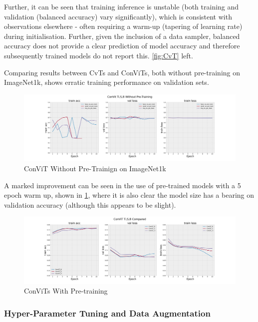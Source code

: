 Further, it can be seen that training inference is unstable (both training and validation (balanced accuracy) vary significantly), which is consistent with observations elsewhere - often requiring a warm-up (tapering of learning rate) during initialisation. Further, given the inclusion of a data sampler, balanced accuracy does not provide a clear prediction of model accuracy and therefore subsequently trained models do not report this. \ref{fig:CvT} left.

Comparing results between CvTs and ConViTs, both without pre-training on ImageNet1k, shows erratic training performance on validation sets. 

\begin{figure}[htp!]
    \centering
    \includegraphics[width=\textwidth]{figures/results_and_discussion/ConViT Ti,S,B Without Pre-Training.png}
    \caption{ConViT Without Pre-Trainign on ImageNet1k}
    \label{fig:ConViT_non_pre_trained}
\end{figure} 

A marked improvement can be seen in the use of pre-trained models with a 5 epoch warm up, shown in \ref{fig:ConViT_non_pre_trained}, where it is also clear the model size has a bearing on validation accuracy (although this appears to be slight). 
\begin{figure}[htp!]
    \centering
    \includegraphics[width=\textwidth]{figures/results_and_discussion/ConViT Ti,S,B Compared.png}
    \caption{ConViTs With Pre-training }
    \label{fig:ConViT_pre_trained}
\end{figure} 

\subsubsection{ Hyper-Parameter Tuning and Data Augmentation}

